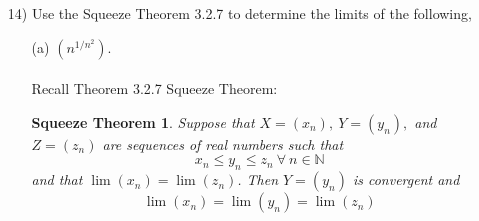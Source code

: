 \documentclass[12pt,letterpaper]{article}
\newcommand{\N}{\mathbb{N}}
\newtheorem*{3.2.7}{Squeeze Theorem}
\theoremstyle{case}
\begin{document}
\begin{enumerate}
\begin{enumerate}
			\begin{align*}
				y_n=\sqrt{n+1}-\sqrt{n} &= \frac{(\sqrt{n+1}-\sqrt{n})(\sqrt{n+1}+\sqrt{n})}{(\sqrt{n+1}+\sqrt{n})}
				\\ &= \frac{(n+1)-n}{\sqrt{n+1}+\sqrt{n}}
				\\ &= \frac{1}{\sqrt{n+1}+\sqrt{n}}
			\end{align*}
			$\implies\ |y_n-0|=\frac{1}{\sqrt{n+1}+\sqrt{n}} < \frac{1}{2\sqrt{n}}$. Now we have that $\lim (\frac{1}{n})=0$ implies $\lim (\frac{1}{\sqrt{n}})=0$ by Theorem 3.2.10.
			\\\\Now, we have
			\[\sqrt{n}y_n=\frac{\sqrt{n}}{\sqrt{n}+\sqrt{n+1}}=\frac{1}{1+\sqrt{\frac{n+1}{n}}}=\frac{1}{1+\sqrt{1+\frac{1}{n}}}\]
			Now, by the algebra of limits and of convergent sequences, we have that as $\lim (\frac{1}{n})=0 \implies \lim (1+\frac{1}{n})=1 \implies \lim \sqrt{1+\frac{1}{n}}=\sqrt{1}=1$ and thus $\lim \left(\frac{1}{1+\sqrt{1+\frac{1}{n}}}\right)=\frac{1}{1+\sqrt{1+0}}=\frac{1}{2}$. Therefore $\lim (\sqrt{n}y_n)$ exists and is equal to $\frac{1}{2}$. \\
			\item[14)] Use the Squeeze Theorem 3.2.7 to determine the limits of the following,
			\begin{enumerate}
				\item[(a)] $(n^{1/n^2})$.
				\\\\Recall Theorem 3.2.7 Squeeze Theorem:
				
				\begin{3.2.7}
					Suppose that $X=(x_n),\ Y=(y_n),$ and $Z=(z_n)$ are sequences of real numbers such that
					\[x_n \leq y_n \leq z_n\ \forall\ n \in \N\]
					and that $\lim (x_n)= \lim (z_n)$. Then $Y=(y_n)$ is convergent and 
					\[\lim(x_n)=\lim(y_n)=\lim(z_n)\]
				\end{3.2.7}
			

\end{enumerate}
\end{enumerate}
\end{enumerate}
\end{document}

